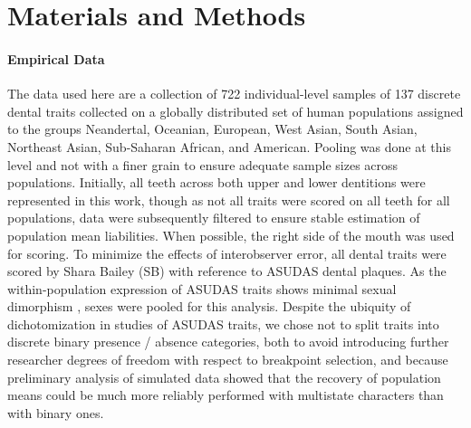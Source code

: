 \documentclass[12pt, twocolumn, twoside]{article}
\begin{document}

\clearpage

\section*{Materials and Methods}

\paragraph{Empirical Data}

The data used here are a collection of 722 individual-level samples of 137 discrete dental traits collected on a globally distributed set of human populations assigned to the groups Neandertal, Oceanian, European, West Asian, South Asian, Northeast Asian, Sub-Saharan African, and American. Pooling was done at this level and not with a finer grain to ensure adequate sample sizes across populations. Initially, all teeth across both upper and lower dentitions were represented in this work, though as not all traits were scored on all teeth for all populations, data were subsequently filtered to ensure stable estimation of population mean liabilities. When possible, the right side of the mouth was used for scoring. To minimize the effects of interobserver error, all dental traits were scored by Shara Bailey (SB) with reference to ASUDAS dental plaques. As the within-population expression of ASUDAS traits shows minimal sexual dimorphism \citep{scottAnthropologyModernHuman2018}, sexes were pooled for this analysis. Despite the ubiquity of dichotomization in studies of ASUDAS traits, we chose not to split traits into discrete binary presence / absence categories, both to avoid introducing further researcher degrees of freedom with respect to breakpoint selection, and because preliminary analysis of simulated data showed that the recovery of population means could be much more reliably performed with multistate characters than with binary ones.
\end{document}
